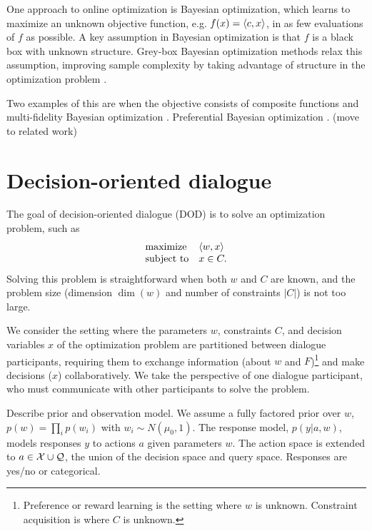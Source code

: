 \documentclass{article}
\theoremstyle{plain}
\theoremstyle{definition}
\theoremstyle{remark}
\begin{document}
One approach to online optimization is Bayesian optimization, which learns to maximize an unknown objective function,
e.g. $f(x) = \left\langle c,x\right\rangle$, in as few evaluations of $f$ as possible.
A key assumption in Bayesian optimization is that $f$ is a black box with unknown structure.
Grey-box Bayesian optimization methods relax this assumption, improving sample complexity by taking advantage of structure in the optimization problem \citep{grey-box-bayesopt}.

Two examples of this are when the objective consists of composite functions \citep{astudillo2019bayesian} and multi-fidelity Bayesian optimization \citep{poloczek2016multiinformation,Zanjani_Foumani_2023}. 
Preferential Bayesian optimization \citep{astudillo2023qeubo}. (move to related work)

\section{Decision-oriented dialogue}
The goal of decision-oriented dialogue (DOD) is to solve an optimization problem, such as
\begin{equation}
\label{eqn:obj}
\begin{array}{ll}
\mbox{maximize} & \left\langle w,x\right\rangle\\
\mbox{subject to} & x \in C.
\end{array}
\end{equation}
Solving this problem is straightforward when both $w$ and $C$ are known,
and the problem size (dimension $\dim(w)$ and number of constraints $|C|$) is not too large.

We consider the setting where the parameters $w$, constraints $C$, and decision variables $x$ of the optimization problem are partitioned between dialogue participants, requiring them to exchange information (about $w$ and $F$)\footnote{Preference or reward learning is the setting where $w$ is unknown. Constraint acquisition is where $C$ is unknown.} and make decisions  ($x$) collaboratively.
We take the perspective of one dialogue participant, who must communicate with other participants to solve the problem.

Describe prior and observation model.
We assume a fully factored prior over $w$, $p(w) = \prod_i p(w_i)$ with $w_i\sim N(\mu_0,1)$.
The response model, $p(y | a,w)$, models responses $y$ to actions $a$ given parameters $w$.
The action space is extended to $a \in \mathcal{X} \cup \mathcal{Q}$, the union of the decision space and query space.
Responses are yes/no or categorical.
\end{document}
